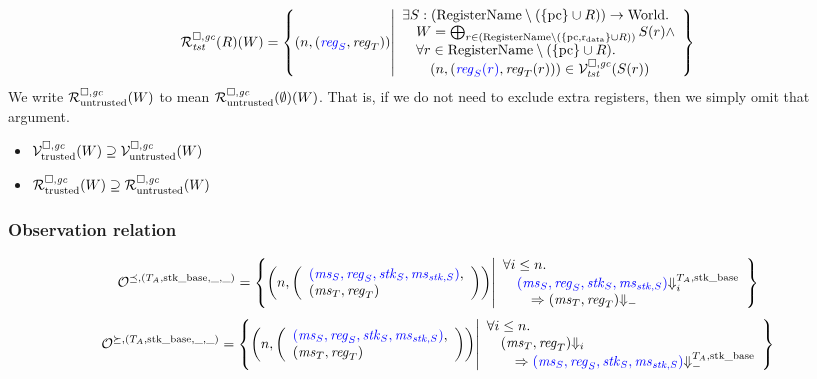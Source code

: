 \[
  \lrrg{\trust}(R)(W) = \left\{ \npair{\stpair{\reg}{\reg}} \middle|
    \begin{array}{l}
      \exists S : (\RegName \setminus (\{\pcreg \} \cup R))\fun \World \ldotp \\
      \quad W = \bigoplus_{r \in (\RegName\setminus (\{\pcreg,\rdata \} \cup R))} S(r) \wedge \\
      \quad \forall r \in \RegName \setminus (\{\pcreg \} \cup R)\ldotp\\
      \qquad\npair{\stpair[.]{\src{\reg_S(r)}}{\reg_T(r)}} \in \lrvg{\trust}(S(r))
    \end{array}
            \right\}
\]
We write $\mathcal{R}^{\square,\mathit{gc}}_{\mathrm{untrusted}}(W)$ to mean $\mathcal{R}^{\square,\mathit{gc}}_{\mathrm{untrusted}}(\emptyset)(W)$. That is, if we do not need to exclude extra registers, then we simply omit that argument.


\begin{lemma}
  \label{lem:untrusted-supset-trust}
  \begin{itemize}
  \item $\mathcal{V}^{\square,\mathit{gc}}_{\mathrm{trusted}}(W) \supseteq \mathcal{V}^{\square,\mathit{gc}}_{\mathrm{untrusted}}(W)$
  \item $\mathcal{R}^{\square,\mathit{gc}}_{\mathrm{trusted}}(W) \supseteq \mathcal{R}^{\square,\mathit{gc}}_{\mathrm{untrusted}}(W)$
  \end{itemize}
\end{lemma}


\subsubsection{Observation relation}
\[
  \lro[\preceq,(\ta,\stkb,\_,\_)] = \left\{ \npair{\left(\array{l}\src{(\ms_S,\reg_S,\stk_S,\ms_{\stk,S})},\\(\ms_T,\reg_T)\endarray\right)} \middle|
    \begin{array}{l}
      \forall i \leq n \ldotp \\
      \quad \src{(\ms_S,\reg_S,\stk_S,\ms_{\stk,S})} \sterm[i]{\ta,\stkb} \\\qquad\Rightarrow (\ms_T,\reg_T) \term\\
    \end{array}
\right\}
\]
\[
  \lro[\succeq,(\ta,\stkb,\_,\_)] = \left\{ \npair{\left(\array{l}\src{(\ms_S,\reg_S,\stk_S,\ms_{\stk,S})},\\(\ms_T,\reg_T)\endarray\right)} \middle|
    \begin{array}{l}
      \forall i \leq n \ldotp \\ 
      \quad (\ms_T ,\reg_T) \term[i] \\\qquad\Rightarrow \src{(\ms_S,\reg_S,\stk_S,\ms_{\stk,S})} \sterm{\ta,\stkb}
    \end{array}
\right\}
\]


